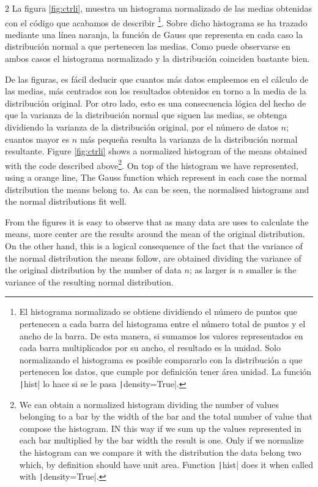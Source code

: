 \begin{paracol}{2}
La figura \ref{fig:ctrli}, muestra un histograma normalizado de las medias obtenidas con el código que acabamos de describir \footnote{El histograma normalizado se obtiene dividiendo el número de puntos que pertenecen a cada barra del histograma entre el número total de puntos y el ancho de la barra. De esta manera, si sumamos los valores representados en cada barra multiplicados por su ancho, el resultado es la unidad. Solo normalizando el histograma es posible compararlo con la distribución a que pertenecen los datos, que cumple por definición tener área unidad. La función \texttt|hist| lo hace si se le pasa \texttt|density=True|.}. Sobre dicho histograma se ha trazado mediante una línea naranja, la función de Gauss que representa en cada caso la distribución normal a que pertenecen las medias. Como puede observarse en ambos casos el histograma normalizado y la distribución coinciden bastante bien.

De las figuras, es fácil deducir que cuantos más datos empleemos en el cálculo de las medias, más centrados son los resultados obtenidos en torno a la media de la distribución original. Por otro lado, esto es una consecuencia lógica del hecho de que la varianza de la distribución normal que siguen las medias, se obtenga dividiendo la varianza de la distribución original, por el número de datos $n$; cuantos mayor es $n$ más pequeña resulta la varianza de la distribución normal resultante.
\switchcolumn
Figure \ref{fig:ctrli} shows a normalized histogram of the means obtained with the code described above\footnote{We can obtain a normalized histogram dividing the number of values belonging to a bar by the width of the bar and the total number of value that compose the histogram. IN this way if we sum up the values represented in each bar multiplied by the bar width the result is one. Only if we normalize the histogram can we compare it with the distribution the data belong two which, by definition should have unit area. Function \texttt|hist| does it when called with \texttt|density=True|.}. On top of the histogram we have represented, using a orange line, The Gauss function which represent in each case the normal distribution the means belong to. As can be seen, the normalised histograms and the normal distributions fit well.

From the figures it is easy to observe that as many data are uses to calculate the means, more center are the results around the mean of the original distribution. On the other hand, this is a logical consequence of the fact that the variance of the normal distribution the means follow, are obtained dividing the variance of the original distribution by the number of data $n$; as larger is $n$ smaller is the variance of the resulting normal distribution.  
\end{paracol}
 
